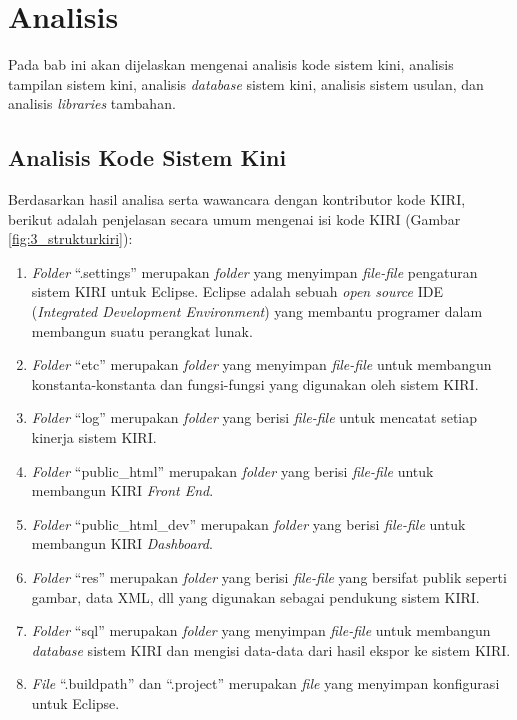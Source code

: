 \chapter{Analisis}
\label{chap:analisis}
Pada bab ini akan dijelaskan mengenai analisis kode sistem kini, analisis tampilan sistem kini, analisis \textit{database} sistem kini, analisis sistem usulan, dan analisis \textit{libraries} tambahan.

\section{Analisis Kode Sistem Kini}
\label{sec:analisissistemkini}
Berdasarkan hasil analisa serta wawancara dengan kontributor kode KIRI, berikut adalah penjelasan secara umum mengenai isi kode KIRI (Gambar \ref{fig:3_strukturkiri}):
\begin{enumerate}
	\item \textit{Folder} ``.settings'' merupakan \textit{folder} yang menyimpan \textit{file-file} pengaturan sistem KIRI untuk Eclipse. Eclipse adalah sebuah \textit{open source} IDE (\textit{Integrated Development Environment}) yang membantu programer dalam membangun suatu perangkat lunak\cite{eclipse}.
	\item \textit{Folder} ``etc'' merupakan \textit{folder} yang menyimpan \textit{file-file} untuk membangun konstanta-konstanta dan fungsi-fungsi yang digunakan oleh sistem KIRI.
	\item \textit{Folder} ``log'' merupakan \textit{folder} yang berisi \textit{file-file} untuk mencatat setiap kinerja sistem KIRI.
	\item \textit{Folder} ``public\_html'' merupakan \textit{folder} yang berisi \textit{file-file} untuk membangun KIRI \textit{Front End}.
	\item \textit{Folder} ``public\_html\_dev'' merupakan \textit{folder} yang berisi \textit{file-file} untuk membangun KIRI \textit{Dashboard}.
	\item \textit{Folder} ``res'' merupakan \textit{folder} yang berisi \textit{file-file} yang bersifat publik seperti gambar, data XML, dll yang digunakan sebagai pendukung sistem KIRI.
	\item \textit{Folder} ``sql'' merupakan \textit{folder} yang menyimpan \textit{file-file} untuk membangun \textit{database} sistem KIRI dan mengisi data-data dari hasil ekspor ke sistem KIRI.
	\item \textit{File} ``.buildpath'' dan ``.project'' merupakan \textit{file} yang menyimpan konfigurasi untuk Eclipse.

\end{enumerate}
